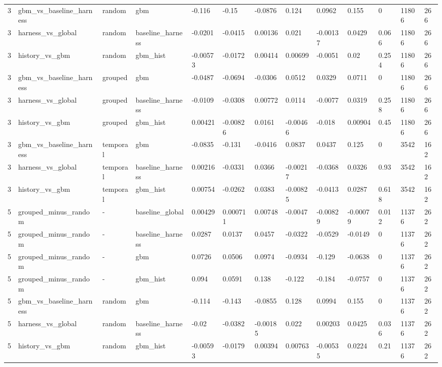 \begin{tabular}{lllllllllllll}
3 & gbm\_vs\_baseline\_harness & random & gbm & -0.116 & -0.15 & -0.0876 & 0.124 & 0.0962 & 0.155 & 0 & 11806 & 266 \\
3 & harness\_vs\_global & random & baseline\_harness & -0.0201 & -0.0415 & 0.00136 & 0.021 & -0.00137 & 0.0429 & 0.066 & 11806 & 266 \\
3 & history\_vs\_gbm & random & gbm\_hist & -0.00573 & -0.0172 & 0.00414 & 0.00699 & -0.0051 & 0.02 & 0.254 & 11806 & 266 \\
3 & gbm\_vs\_baseline\_harness & grouped & gbm & -0.0487 & -0.0694 & -0.0306 & 0.0512 & 0.0329 & 0.0711 & 0 & 11806 & 266 \\
3 & harness\_vs\_global & grouped & baseline\_harness & -0.0109 & -0.0308 & 0.00772 & 0.0114 & -0.0077 & 0.0319 & 0.258 & 11806 & 266 \\
3 & history\_vs\_gbm & grouped & gbm\_hist & 0.00421 & -0.00826 & 0.0161 & -0.00466 & -0.018 & 0.00904 & 0.45 & 11806 & 266 \\
3 & gbm\_vs\_baseline\_harness & temporal & gbm & -0.0835 & -0.131 & -0.0416 & 0.0837 & 0.0437 & 0.125 & 0 & 3542 & 162 \\
3 & harness\_vs\_global & temporal & baseline\_harness & 0.00216 & -0.0331 & 0.0366 & -0.00217 & -0.0368 & 0.0326 & 0.93 & 3542 & 162 \\
3 & history\_vs\_gbm & temporal & gbm\_hist & 0.00754 & -0.0262 & 0.0383 & -0.00825 & -0.0413 & 0.0287 & 0.618 & 3542 & 162 \\
5 & grouped\_minus\_random & - & baseline\_global & 0.00429 & 0.000711 & 0.00748 & -0.0047 & -0.00829 & -0.00079 & 0.012 & 11376 & 262 \\
5 & grouped\_minus\_random & - & baseline\_harness & 0.0287 & 0.0137 & 0.0457 & -0.0322 & -0.0529 & -0.0149 & 0 & 11376 & 262 \\
5 & grouped\_minus\_random & - & gbm & 0.0726 & 0.0506 & 0.0974 & -0.0934 & -0.129 & -0.0638 & 0 & 11376 & 262 \\
5 & grouped\_minus\_random & - & gbm\_hist & 0.094 & 0.0591 & 0.138 & -0.122 & -0.184 & -0.0757 & 0 & 11376 & 262 \\
5 & gbm\_vs\_baseline\_harness & random & gbm & -0.114 & -0.143 & -0.0855 & 0.128 & 0.0994 & 0.155 & 0 & 11376 & 262 \\
5 & harness\_vs\_global & random & baseline\_harness & -0.02 & -0.0382 & -0.00185 & 0.022 & 0.00203 & 0.0425 & 0.036 & 11376 & 262 \\
5 & history\_vs\_gbm & random & gbm\_hist & -0.00593 & -0.0179 & 0.00394 & 0.00763 & -0.00535 & 0.0224 & 0.21 & 11376 & 262 \\

\end{tabular}

